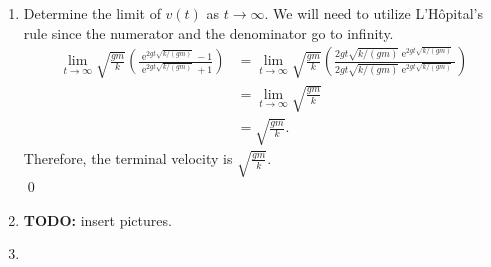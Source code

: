 \documentclass[10pt]{amsart}
\DeclareMathOperator{\E}{e}
\theoremstyle{nonumberplain}
\begin{document}
\begin{enumerate}[label={\bf {\arabic*}:}]
\begin{enumerate}
\begin{align*}
\log \left( \frac {1 + \sqrt{k/(gm)} \: v}{1 - \sqrt{k/(gm)} \: v}\right) 
	 &= 2 g t \sqrt{k/(gm)}.
\end{align*}
Now we can exponentiate and solve for $v$
\begin{align*}
\frac {1 + \sqrt{k/(gm)} \: v}{1 - \sqrt{k/(gm)} \: v}
	 &= \E^{2 g t \sqrt{k/(gm)}} \\
1 + \sqrt{k/(gm)} \: v
	 &= \E^{2 g t \sqrt{k/(gm)}}(1 - \sqrt{k/(gm)} \: v) \\
1 + \sqrt{k/(gm)} \: v 
	 &= \E^{2 g t \sqrt{k/(gm)}} - \sqrt{k/(gm)} \: v \E^{2 g t \sqrt{k/(gm)}} \\
\sqrt{k/(gm)} \: v +  \sqrt{k/(gm)} \: v \E^{2 g t \sqrt{k/(gm)}}
	 &= \E^{2 g t \sqrt{k/(gm)}} - 1 \\
v &= \frac {\E^{2 g t \sqrt{k/(gm)}} - 1}{\sqrt{k/(gm)} +  \sqrt{k/(gm)} \E^{2 g t \sqrt{k/(gm)}}}.
\end{align*}
Some final simplifications gives us
\begin{align*}
v &= \frac 1 {\sqrt{k/(gm)}}\frac {\E^{2 g t \sqrt{k/(gm)}} - 1}{1 +  \E^{2 g t \sqrt{k/(gm)}}} \\
v &= \sqrt{\frac {gm}{k}} \left( \frac {\E^{2 g t \sqrt{k/(gm)}} - 1}{\E^{2 g t \sqrt{k/(gm)}}+ 1} \right).
\end{align*}
Therefore our final analytical solution is 
$$
v = \sqrt{\frac {gm}{k}} \left( \frac {\E^{2 g t \sqrt{k/(gm)}} - 1}{\E^{2 g t \sqrt{k/(gm)}}+ 1} \right).
$$
\qed \\

\item Determine the limit of $v(t)$ as $t\rightarrow \infty$.
We will need to utilize L'Hôpital's rule since the numerator and the denominator go to infinity.
\begin{align*}
\lim_{t\rightarrow \infty} \sqrt{\frac {gm}{k}} \left( \frac {\E^{2 g t \sqrt{k/(gm)}} - 1}{\E^{2 g t \sqrt{k/(gm)}}+ 1} \right)
	&= \lim_{t\rightarrow \infty} \sqrt{\frac {gm}{k}} \left( \frac {2 g t \sqrt{k/(gm)}\E^{2 g t \sqrt{k/(gm)}}}{2 g t \sqrt{k/(gm)}\E^{2 g t \sqrt{k/(gm)}}} \right) \\
	&= \lim_{t\rightarrow \infty} \sqrt{\frac {gm}{k}} \\
	&= \sqrt{\frac {gm}{k}}.
\end{align*}
Therefore, the terminal velocity is $\sqrt{\frac {gm}{k}}$. \\
\qed \\

\item \textbf{TODO:} insert pictures.
\item 
\end{enumerate}


\end{enumerate}
\end{document}
